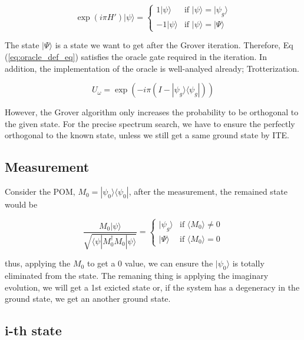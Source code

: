 \documentclass[twocolumn]{article}
\begin{document}
\begin{equation}
    \label{eq:oracle_def_eq}
    \exp(i \pi H') |\psi \rangle = \begin{cases}
        1 |\psi \rangle & \text{if }  |\psi \rangle = |\psi_g \rangle\\
        -1 |\psi \rangle & \text{if }  |\psi \rangle = |\Psi \rangle
    \end{cases}
\end{equation}

The state $|\Psi \rangle$ is a state we want to get 
after the Grover iteration. Therefore, Eq (\ref{eq:oracle_def_eq}) satisfies 
the oracle gate required in the iteration. In addition, the implementation of the oracle is 
well-analyed already; Trotterization.

\begin{equation}
    U_\omega = \exp(- i \pi (I-| \psi_g \rangle \langle \psi_g|) )
\end{equation}

However, the Grover algorithm only increases the probability to be orthogonal
to the given state. For the precise spectrum search, we have to ensure the perfectly 
orthogonal to the known state, unless we still get a same ground state by ITE.

\subsection{Measurement}

Consider the POM, $M_0 = |\psi_0 \rangle \langle \psi_0|$, 
after the measurement, the remained state would be 

\begin{equation}
    \frac{M_0 |\psi \rangle}{\sqrt{\langle \psi |M_0^\dagger M_0|\psi \rangle}} = \begin{cases}
        |\psi_g \rangle & \text{if } \langle M_0 \rangle \neq 0\\
        |\Psi \rangle & \text{if } \langle M_0 \rangle = 0
    \end{cases}
\end{equation}

thus, applying the $M_0$ to get a 0 value, we can ensure the $|\psi_0\rangle$ 
is totally eliminated from the state.
The remaning thing is applying the imaginary evolution, we will get a 
1st exicted state or, if the system has a degeneracy in the ground state,
we get an another ground state.

\subsection{i-th state}
\end{document}
